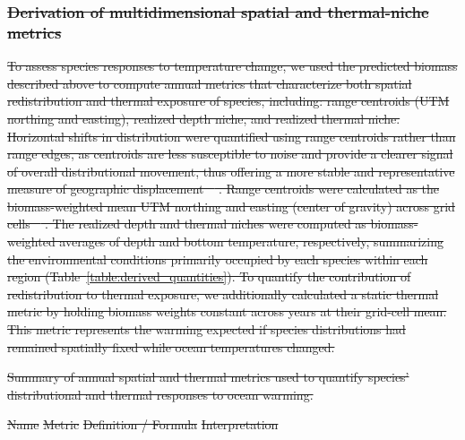 \documentclass[9pt,twocolumn,twoside]{pnas-new}
\providecommand{\DIFdel}[1]{{\protect\color{red}\sout{#1}}} %
\providecommand{\DIFdelFL}[1]{\DIFdel{#1}} %
\begin{document}
{%
\subsubsection*{\DIFdel{Derivation of multidimensional spatial and thermal-niche metrics}} 
\DIFdel{To assess species responses to temperature change, we used the predicted biomass described above to compute annual metrics that characterize both spatial redistribution and thermal exposure of species, including:  range centroids (UTM northing and easting), realized depth niche, and realized thermal niche. Horizontal shifts in distribution were quantified using range centroids rather than range edges, as centroids are less susceptible to noise and provide a clearer signal of overall distributional movement, thus offering a more stable and representative measure of geographic displacement \mbox{%
\citep{shoo_detecting_2006}}\hskip0pt%
. Range centroids were calculated as the biomass-weighted mean UTM northing and easting (center of gravity) across grid cells \mbox{%
\citep{thorson_model-based_2016}}\hskip0pt%
. The realized depth and thermal niches were computed as biomass-weighted averages of depth and bottom temperature, respectively,  summarizing the environmental conditions primarily occupied by each species within each region (Table~\ref{table:derived_quantities}). To quantify the contribution of redistribution to thermal exposure, we additionally calculated a static thermal metric by holding biomass weights constant across years at their grid-cell mean. This metric represents the warming expected if species distributions had remained spatially fixed while ocean temperatures changed.
}%

{%
\DIFdelFL{Summary of annual spatial and thermal metrics used to quantify species’ distributional and thermal responses to ocean warming.}}

\DIFdelFL{Name }%
\DIFdelFL{Metric }%
\DIFdelFL{Definition / Formula }%
\DIFdelFL{Interpretation }%

}
\end{document}
